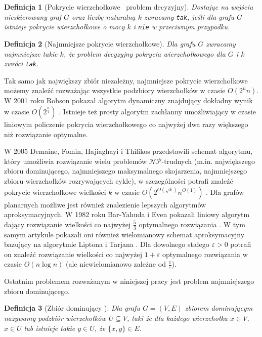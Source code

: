 \documentclass[twoside,a4paper,12pt]{report} %
\theoremstyle{break}
\newtheorem{definition}{Definicja}[section]
\begin{document}
\begin{definition}[Pokrycie wierzchołkowe \textendash\ problem decyzyjny]
Dostając na wejściu nieskierowany graf $G$ oraz liczbę naturalną $k$ zwracamy \texttt{tak}, jeśli dla grafu $G$ istnieje pokrycie wierzchołkowe o mocy $k$ i \texttt{nie} w przeciwnym przypadku.
\end{definition}

\begin{definition}[Najmniejsze pokrycie wierzchołkowe]
Dla grafu $G$ zwracamy najmniejsze takie $k$, że problem decyzyjny pokrycia wierzchołkowego dla $G$ i $k$ zwróci \texttt{tak}.
\end{definition}

Tak samo jak największy zbiór niezależny, najmniejsze pokrycie wierzchołkowe możemy znaleźć rozważając wszystkie podzbiory wierzchołków w czasie $O(2^nn)$. W 2001 roku Robson pokazał algorytm dynamiczny znajdujący dokładny wynik w czasie $O(2^{\frac{n}{4}})$ \cite{robson}. Istnieje też prosty algorytm zachłanny umożliwiający w czasie liniowym policzenie pokrycia wierzchołkowego co najwyżej dwa razy większego niż rozwiązanie optymalne. 

W 2005 Demaine, Fomin, Hajiaghayi i Thilikos przedstawili schemat algorytmu, który umożliwia rozwiązanie wielu problemów $\mathcal{NP}$-trudnych (m.in. największego zbioru dominującego, najmniejszego maksymalnego skojarzenia, najmniejszego zbioru wierzchołków rozrywających cykle), w szczególności potrafi znaleźć pokrycie wierzchołkowe wielkości $k$ w czasie $O(2^{O(\sqrt{k})}n^{O(1)})$ \cite{erik}. Dla grafów planarnych możliwe jest również znalezienie lepszych algorytmów aproksymacyjnych. W 1982 roku Bar-Yahuda i Even pokazali liniowy algorytm dający rozwiązanie wielkości co najwyżej $\frac{5}{3}$ optymalnego rozwiązania \cite{bar}. W tym samym artykule pokazali oni również wielomianowy schemat aproksymacyjny bazujący na algorytmie Liptona i Tarjana \cite{lipton}. Dla dowolnego stałego $\varepsilon > 0$ potrafi on znaleźć rozwiązanie wielkości co najwyżej $1 + \varepsilon$ optymalnego rozwiązania w czasie $O(n \log n)$ (ale niewielomianowo zależne od $\frac{1}{\varepsilon}$).

Ostatnim problemem rozważanym w niniejszej pracy jest problem najmniejszego zbioru dominującego.

\begin{definition}[Zbiór dominujący \cite{graph}]
Dla grafu $G=(V,E)$ \emph{zbiorem dominującym} nazywamy podzbiór wierzchołków $U \subseteq V$, taki że dla każdego wierzchołka $x \in V$, $x \in U$ lub istnieje takie $y \in U$, że $\{x,y\} \in E$.
\end{definition}
\end{document}

